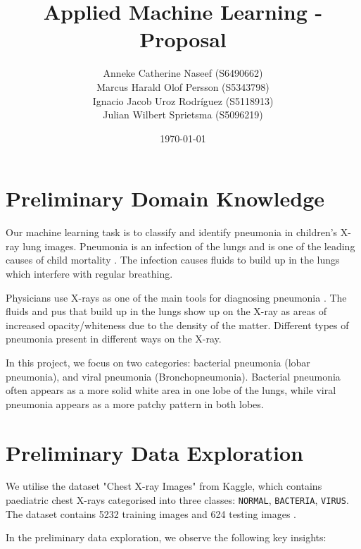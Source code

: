 \documentclass{article}
\title{\textbf{Applied Machine Learning - Proposal}}
\author{
        Anneke Catherine Naseef (S6490662) \\
        Marcus Harald Olof Persson (S5343798) \\
        Ignacio Jacob Uroz Rodríguez (S5118913) \\
        Julian Wilbert Sprietsma (S5096219) \\
}
\date{\today}
\begin{document}
\maketitle

\section{Preliminary Domain Knowledge}

Our machine learning task is to classify and identify pneumonia in children's X-ray lung images. Pneumonia is an infection of the lungs and is one of the leading causes of child mortality \cite{yadav2023childhood}. The infection causes fluids to build up in the lungs which interfere with regular breathing. 

Physicians use X-rays as one of the main tools for diagnosing pneumonia \cite{xrayspneumonia}. The fluids and pus that build up in the lungs show up on the X-ray as areas of increased opacity/whiteness due to the density of the matter. Different types of pneumonia present in different ways on the X-ray.

In this project, we focus on two categories: bacterial pneumonia (lobar pneumonia), and viral pneumonia (Bronchopneumonia). Bacterial pneumonia often appears as a more solid white area in one lobe of the lungs, while viral pneumonia appears as a more patchy pattern in both lobes.

\section{Preliminary Data Exploration}

We utilise the dataset "Chest X-ray Images" from Kaggle, which contains paediatric chest X-rays categorised into three classes: \texttt{NORMAL}, \texttt{BACTERIA}, \texttt{VIRUS}. The dataset contains 5232 training images and 624 testing images \cite{tolgadincer_chest_xray_2018}. 

In the preliminary data exploration, we observe the following key insights:
\end{document}
